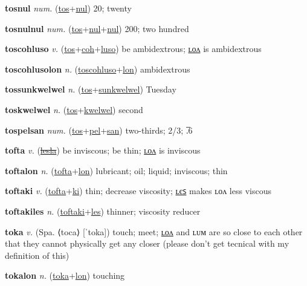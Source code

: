 \textbf{\hypertarget{tosnul}{tosnul}} \textit{num.} (\hyperlink{tos}{tos}+\allowbreak \hyperlink{nul}{nul})
20; twenty

\textbf{\hypertarget{tosnulnul}{tosnulnul}} \textit{num.} (\hyperlink{tos}{tos}+\allowbreak \hyperlink{nul}{nul}+\allowbreak \hyperlink{nul}{nul})
200; two hundred

\textbf{\hypertarget{toscohluso}{toscohluso}} \textit{v.} (\hyperlink{tos}{tos}+\allowbreak \hyperlink{coh}{coh}+\allowbreak \hyperlink{luso}{luso})
be ambidextrous; \hyperlink{toscohlusolon}{ʟᴏᴧ} is ambidextrous

\textbf{\hypertarget{toscohlusolon}{toscohlusolon}} \textit{n.} (\hyperlink{toscohluso}{toscohluso}+\allowbreak \hyperlink{lon}{lon})
ambidextrous

\textbf{\hypertarget{tossunkwelwel}{tossunkwelwel}} \textit{n.} (\hyperlink{tos}{tos}+\allowbreak \hyperlink{sunkwelwel}{sunkwelwel})
Tuesday

\textbf{\hypertarget{toskwelwel}{toskwelwel}} \textit{n.} (\hyperlink{tos}{tos}+\allowbreak \hyperlink{kwelwel}{kwelwel})
second

\textbf{\hypertarget{tospelsan}{tospelsan}} \textit{num.} (\hyperlink{tos}{tos}+\allowbreak \hyperlink{pel}{pel}+\allowbreak \hyperlink{san}{san})
two-thirds; 2/3; .̅6

\textbf{\hypertarget{tofta}{tofta}} \textit{v.} (\hyperlink{lesla}{\sout{lesla}})
be inviscous; be thin; \hyperlink{toftalon}{ʟᴏᴧ} is inviscous

\textbf{\hypertarget{toftalon}{toftalon}} \textit{n.} (\hyperlink{tofta}{tofta}+\allowbreak \hyperlink{lon}{lon})
lubricant; oil; liquid; inviscous; thin

\textbf{\hypertarget{toftaki}{toftaki}} \textit{v.} (\hyperlink{tofta}{tofta}+\allowbreak \hyperlink{ki}{ki})
thin; decrease viscosity; \hyperlink{toftakiles}{ʟєꜱ} makes ʟᴏᴧ less viscous

\textbf{\hypertarget{toftakiles}{toftakiles}} \textit{n.} (\hyperlink{toftaki}{toftaki}+\allowbreak \hyperlink{les}{les})
thinner; viscosity reducer

\textbf{\hypertarget{toka}{toka}} \textit{v.} (Spa. ⟨toca⟩ [ˈtoka])
touch; meet; \hyperlink{tokalon}{ʟᴏᴧ} and ʟᴜᴍ are so close to each other that they cannot physically get any closer (please don’t get tecnical with my definition of this)

\textbf{\hypertarget{tokalon}{tokalon}} \textit{n.} (\hyperlink{toka}{toka}+\allowbreak \hyperlink{lon}{lon})
touching

